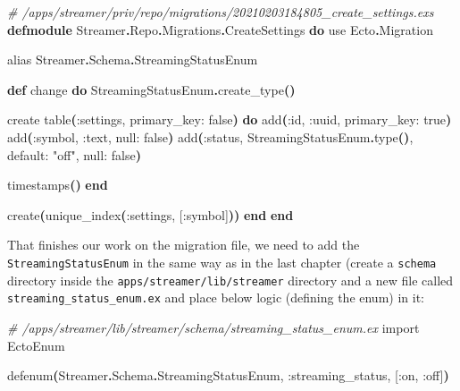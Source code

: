\documentclass[
  oneside]{book}
\newenvironment{Shaded}{\begin{snugshade}}{\end{snugshade}}
\newcommand{\CommentTok}[1]{\textcolor[rgb]{0.56,0.35,0.01}{\textit{#1}}}
\newcommand{\ConstantTok}[1]{\textcolor[rgb]{0.56,0.35,0.01}{#1}}
\newcommand{\FunctionTok}[1]{\textcolor[rgb]{0.13,0.29,0.53}{\textbf{#1}}}
\newcommand{\ImportTok}[1]{#1}
\newcommand{\KeywordTok}[1]{\textcolor[rgb]{0.13,0.29,0.53}{\textbf{#1}}}
\newcommand{\NormalTok}[1]{#1}
\newcommand{\OperatorTok}[1]{\textcolor[rgb]{0.81,0.36,0.00}{\textbf{#1}}}
\newcommand{\OtherTok}[1]{\textcolor[rgb]{0.56,0.35,0.01}{#1}}
\newcommand{\StringTok}[1]{\textcolor[rgb]{0.31,0.60,0.02}{#1}}
\newcommand{\VariableTok}[1]{\textcolor[rgb]{0.00,0.00,0.00}{#1}}
\begin{document}
\begin{Shaded}
\begin{Highlighting}[]
\CommentTok{\# /apps/streamer/priv/repo/migrations/20210203184805\_create\_settings.exs}
\KeywordTok{defmodule} \ConstantTok{Streamer}\OperatorTok{.}\ConstantTok{Repo}\OperatorTok{.}\ConstantTok{Migrations}\OperatorTok{.}\ConstantTok{CreateSettings} \KeywordTok{do}
  \ImportTok{use} \ConstantTok{Ecto}\OperatorTok{.}\ConstantTok{Migration}

  \ImportTok{alias} \ConstantTok{Streamer}\OperatorTok{.}\ConstantTok{Schema}\OperatorTok{.}\ConstantTok{StreamingStatusEnum}

  \KeywordTok{def}\NormalTok{ change }\KeywordTok{do}
    \ConstantTok{StreamingStatusEnum}\OperatorTok{.}\NormalTok{create\_type}\FunctionTok{()}

\NormalTok{    create table}\FunctionTok{(}\VariableTok{:settings}\NormalTok{, }\VariableTok{primary\_key:} \ConstantTok{false}\FunctionTok{)} \KeywordTok{do}
\NormalTok{      add}\FunctionTok{(}\VariableTok{:id}\NormalTok{, }\VariableTok{:uuid}\NormalTok{, }\VariableTok{primary\_key:} \ConstantTok{true}\FunctionTok{)}
\NormalTok{      add}\FunctionTok{(}\VariableTok{:symbol}\NormalTok{, }\VariableTok{:text}\NormalTok{, }\VariableTok{null:} \ConstantTok{false}\FunctionTok{)}
\NormalTok{      add}\FunctionTok{(}\VariableTok{:status}\NormalTok{, }\ConstantTok{StreamingStatusEnum}\OperatorTok{.}\NormalTok{type}\FunctionTok{()}\NormalTok{, }\VariableTok{default:} \StringTok{"off"}\NormalTok{, }\VariableTok{null:} \ConstantTok{false}\FunctionTok{)}
      
\NormalTok{      timestamps}\FunctionTok{()}
    \KeywordTok{end}

\NormalTok{    create}\FunctionTok{(}\NormalTok{unique\_index}\FunctionTok{(}\VariableTok{:settings}\NormalTok{, }\OtherTok{[}\VariableTok{:symbol}\OtherTok{]}\FunctionTok{))}
  \KeywordTok{end}
\KeywordTok{end}
\end{Highlighting}
\end{Shaded}

That finishes our work on the migration file, we need to add the \texttt{StreamingStatusEnum} in the same way as in the last chapter (create a \texttt{schema} directory inside the \texttt{apps/streamer/lib/streamer} directory and a new file called \texttt{streaming\_status\_enum.ex} and place below logic (defining the enum) in it:

\begin{Shaded}
\begin{Highlighting}[]
\CommentTok{\# /apps/streamer/lib/streamer/schema/streaming\_status\_enum.ex}
\ImportTok{import} \ConstantTok{EctoEnum}

\NormalTok{defenum}\FunctionTok{(}\ConstantTok{Streamer}\OperatorTok{.}\ConstantTok{Schema}\OperatorTok{.}\ConstantTok{StreamingStatusEnum}\NormalTok{, }\VariableTok{:streaming\_status}\NormalTok{, }\OtherTok{[}\VariableTok{:on}\NormalTok{, }\VariableTok{:off}\OtherTok{]}\FunctionTok{)}
\end{Highlighting}
\end{Shaded}
\end{document}
